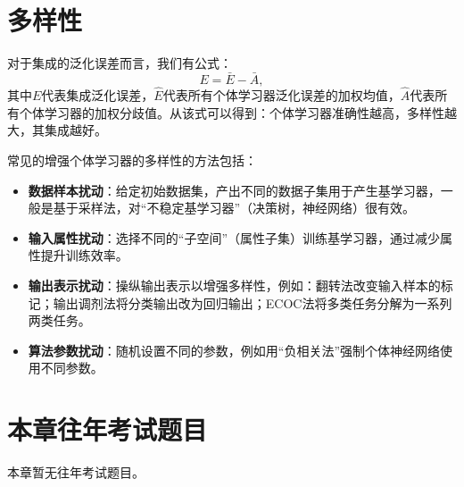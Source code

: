 \section{多样性}\label{sec:8.5}
对于集成的泛化误差而言，我们有公式：
\[
E = \bar{E} - \bar{A},
\]
其中$E$代表集成泛化误差，$\hat{E}$代表所有个体学习器泛化误差的加权均值，$\hat{A}$代表所有个体学习器的加权分歧值。从该式可以得到：个体学习器准确性越高，多样性越大，其集成越好。

常见的增强个体学习器的多样性的方法包括：
\begin{itemize}
    \item \textbf{数据样本扰动}：给定初始数据集，产出不同的数据子集用于产生基学习器，一般是基于采样法，对“不稳定基学习器”（决策树，神经网络）很有效。
    \item \textbf{输入属性扰动}：选择不同的“子空间”（属性子集）训练基学习器，通过减少属性提升训练效率。
    \item \textbf{输出表示扰动}：操纵输出表示以增强多样性，例如：翻转法改变输入样本的标记；输出调剂法将分类输出改为回归输出；ECOC法将多类任务分解为一系列两类任务。
    \item \textbf{算法参数扰动}：随机设置不同的参数，例如用“负相关法”强制个体神经网络使用不同参数。
\end{itemize}

\section{本章往年考试题目}\label{sec:8.6}

本章暂无往年考试题目。